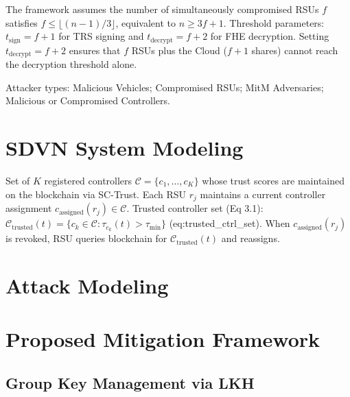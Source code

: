 The framework assumes the number of simultaneously compromised RSUs $f$ satisfies $f \leq \lfloor (n-1)/3 \rfloor$, equivalent to $n \geq 3f+1$. Threshold parameters: $t_{\mathrm{sign}} = f+1$ for TRS signing and $t_{\mathrm{decrypt}} = f+2$ for FHE decryption. Setting $t_{\mathrm{decrypt}} = f+2$ ensures that $f$ RSUs plus the Cloud ($f+1$ shares) cannot reach the decryption threshold alone.

Attacker types: Malicious Vehicles; Compromised RSUs; MitM Adversaries; Malicious or Compromised Controllers.

\section{SDVN System Modeling}

Set of $K$ registered controllers $\mathcal{C} = \{c_1, \ldots, c_K\}$ whose trust scores are maintained on the blockchain via SC-Trust. Each RSU $r_j$ maintains a current controller assignment $c_{\mathrm{assigned}}(r_j) \in \mathcal{C}$. Trusted controller set (Eq 3.1):
$\mathcal{C}_{\mathrm{trusted}}(t) = \{c_k \in \mathcal{C} : \tau_{c_k}(t) > \tau_{\min}\}$ (eq:trusted_ctrl_set).
When $c_{\mathrm{assigned}}(r_j)$ is revoked, RSU queries blockchain for $\mathcal{C}_{\mathrm{trusted}}(t)$ and reassigns.

\section{Attack Modeling} %

\section{Proposed Mitigation Framework}


\subsection{Group Key Management via LKH}

